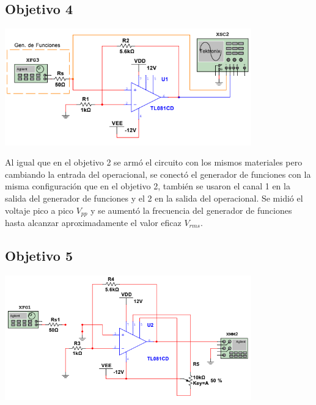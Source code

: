 \documentclass[DIV=calc, paper=a4, fontsize=11pt]{scrartcl}
\newenvironment{Figura}
  {\par\medskip\noindent\minipage{\linewidth}}
  {\endminipage\par\medskip}
\begin{document}
\begin{multicols}{2}
\subsection*{Objetivo 4}

\begin{Figura}
    \centering
    \includegraphics[width=0.8\textwidth]{diagramas/diagrama objetivo 3.PNG}
    \label{fig}
\end{Figura}

Al igual que en el objetivo 2 se armó el circuito con los mismos materiales pero cambiando la entrada del operacional, se conectó el generador de funciones con la misma configuración que en el objetivo 2, también se usaron el canal 1 en la salida del generador de funciones y el 2 en la salida del operacional. Se midió el voltaje pico a pico $V_{pp}$ y se aumentó la frecuencia del generador de funciones hasta alcanzar aproximadamente el valor eficaz $V_{rms}$.

\subsection*{Objetivo 5}

\begin{Figura}
    \centering
    \includegraphics[width=0.8\textwidth]{diagramas/diagama objetivo 3.1.PNG}
    \label{fig}
\end{Figura}


\end{multicols}
\end{document}
